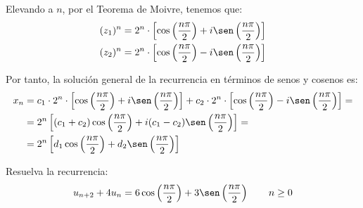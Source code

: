 \begin{ejercicio}
    Elevando a $n$, por el Teorema de Moivre, tenemos que:
    \begin{align*}
        (z_1)^n &= 2^n\cdot \left[\cos\left(\frac{n\pi}{2}\right) + i\sen\left(\frac{n\pi}{2}\right)\right]\\
        (z_2)^n &= 2^n\cdot \left[\cos\left(\frac{n\pi}{2}\right) - i\sen\left(\frac{n\pi}{2}\right)\right]
    \end{align*}

    Por tanto, la solución general de la recurrencia en términos de senos y cosenos es:
    \begin{align*}
        x_n &= c_1\cdot 2^n\cdot \left[\cos\left(\frac{n\pi}{2}\right) + i\sen\left(\frac{n\pi}{2}\right)\right] + c_2\cdot 2^n\cdot \left[\cos\left(\frac{n\pi}{2}\right) - i\sen\left(\frac{n\pi}{2}\right)\right] =\\
        &= 2^n\left[(c_1+c_2)\cos\left(\frac{n\pi}{2}\right) + i(c_1-c_2)\sen\left(\frac{n\pi}{2}\right)\right] =\\
        &= 2^n\left[d_1\cos\left(\frac{n\pi}{2}\right) + d_2\sen\left(\frac{n\pi}{2}\right)\right]
    \end{align*}
\end{ejercicio}

\begin{ejercicio}
    Resuelva la recurrencia:
    \begin{equation*}
        u_{n+2} + 4u_n = 6\cos\left(\frac{n\pi}{2}\right) + 3\sen\left(\frac{n\pi}{2}\right) \qquad n\geq 0
    \end{equation*}

    \begin{comment} %
    Por el ejercicio~\ref{ej:recurrenciaComplejos}, tenemos que:
    \begin{equation*}
        x_n^{(h)} = 2^n\left[d_1\cos\left(\frac{n\pi}{2}\right) + d_2\sen\left(\frac{n\pi}{2}\right)\right]
    \end{equation*}
    \end{comment}
\end{ejercicio}

